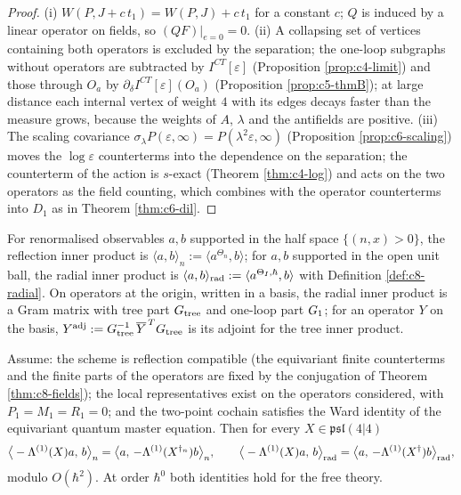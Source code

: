 \begin{proof}
(i) $W(P,J+c\,t_1)=W(P,J)+c\,t_1$ for a constant $c$; $Q$ is induced by a linear operator on fields, so $(QF)|_{e=0}=0$. (ii) A collapsing set of vertices containing both operators is excluded by the separation; the one-loop subgraphs without operators are subtracted by $I^{CT}[\varepsilon]$ (Proposition \ref{prop:c4-limit}) and those through $O_a$ by $\partial_\delta I^{CT}[\varepsilon](O_a)$ (Proposition \ref{prop:c5-thmB}); at large distance each internal vertex of weight $4$ with its edges decays faster than the measure grows, because the weights of $A$, $\lambda$ and the antifields are positive. (iii) The scaling covariance $\sigma_\lambda P(\varepsilon,\infty)=P(\lambda^2\varepsilon,\infty)$ (Proposition \ref{prop:c6-scaling}) moves the $\log\varepsilon$ counterterms into the dependence on the separation; the counterterm of the action is $s$-exact (Theorem \ref{thm:c4-log}) and acts on the two operators as the field counting, which combines with the operator counterterms into $D_1$ as in Theorem \ref{thm:c6-dil}.
\end{proof}

\begin{definition}
\label{def:c8-inner}
For renormalised observables $a,b$ supported in the half space $\{(n,x)>0\}$, the reflection inner product is $\langle a,b\rangle_n:=\langle a^{\Theta_n},b\rangle$; for $a,b$ supported in the open unit ball, the radial inner product is $\langle a,b\rangle_{\rm rad}:=\langle a^{\Theta_I,\hbar},b\rangle$ with Definition \ref{def:c8-radial}. On operators at the origin, written in a basis, the radial inner product is a Gram matrix with tree part $G_{\rm tree}$ and one-loop part $G_{\rm 1}$; for an operator $Y$ on the basis, $Y^{\rm adj}:=G_{\rm tree}^{-1}\,\overline{Y}^{\,T}G_{\rm tree}$ is its adjoint for the tree inner product.
\end{definition}

\begin{theorem}[Adjointness]
\label{thm:c8-adjoint}
Assume: the scheme is reflection compatible (the equivariant finite counterterms and the finite parts of the operators are fixed by the conjugation of Theorem \ref{thm:c8-fields}); the local representatives exist on the operators considered, with $P_1=M_1=R_1=0$; and the two-point cochain satisfies the Ward identity of the equivariant quantum master equation. Then for every $X\in\mathfrak{psl}(4|4)$
\[
\big\langle-\Lambda^{(1)}(X)a,\,b\big\rangle_n=\big\langle a,\,-\Lambda^{(1)}(X^{\dagger_n})b\big\rangle_n,\qquad
\big\langle-\Lambda^{(1)}(X)a,\,b\big\rangle_{\rm rad}=\big\langle a,\,-\Lambda^{(1)}(X^{\dagger})b\big\rangle_{\rm rad},
\]
modulo $O(\hbar^2)$. At order $\hbar^0$ both identities hold for the free theory.
\end{theorem}

